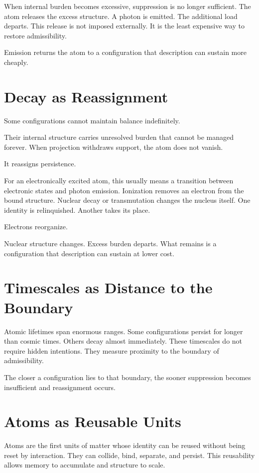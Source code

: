 \documentclass[11pt,twoside,openright]{book}
\begin{document}
When internal burden becomes excessive, suppression is no longer sufficient. The atom releases the excess structure. A photon is emitted. The additional load departs. This release is not imposed externally. It is the least expensive way to restore admissibility.

Emission returns the atom to a configuration that description can sustain more cheaply.

\section*{Decay as Reassignment}

Some configurations cannot maintain balance indefinitely.

Their internal structure carries unresolved burden that cannot be managed forever. When projection withdraws support, the atom does not vanish.

It reassigns persistence.

For an electronically excited atom, this usually means a transition between electronic states and photon emission. Ionization removes an electron from the bound structure. Nuclear decay or transmutation changes the nucleus itself. One identity is relinquished. Another takes its place.

Electrons reorganize.

Nuclear structure changes. Excess burden departs. What remains is a configuration that description can sustain at lower cost.

\section*{Timescales as Distance to the Boundary}

Atomic lifetimes span enormous ranges. Some configurations persist for longer than cosmic times. Others decay almost immediately. These timescales do not require hidden intentions. They measure proximity to the boundary of admissibility.

The closer a configuration lies to that boundary, the sooner suppression becomes insufficient and reassignment occurs.

\section*{Atoms as Reusable Units}

Atoms are the first units of matter whose identity can be reused without being reset by interaction. They can collide, bind, separate, and persist. This reusability allows memory to accumulate and structure to scale.
\end{document}
